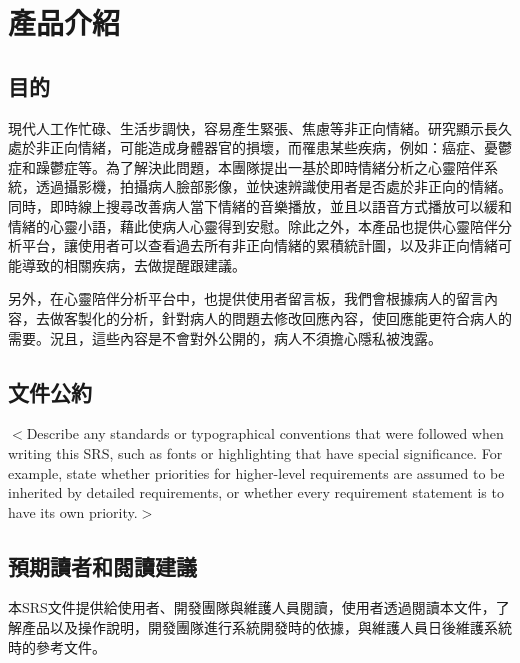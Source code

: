 \documentclass[12pt]{scrreprt}
\begin{document}
\chapter{產品介紹}

\section{目的}

現代人工作忙碌、生活步調快，容易產生緊張、焦慮等非正向情緒。研究顯示長久處於非正向情緒，可能造成身體器官的損壞，而罹患某些疾病，例如：癌症、憂鬱症和躁鬱症等。為了解決此問題，本團隊提出一基於即時情緒分析之心靈陪伴系統，透過攝影機，拍攝病人臉部影像，並快速辨識使用者是否處於非正向的情緒。同時，即時線上搜尋改善病人當下情緒的音樂播放，並且以語音方式播放可以緩和情緒的心靈小語，藉此使病人心靈得到安慰。除此之外，本產品也提供心靈陪伴分析平台，讓使用者可以查看過去所有非正向情緒的累積統計圖，以及非正向情緒可能導致的相關疾病，去做提醒跟建議。

另外，在心靈陪伴分析平台中，也提供使用者留言板，我們會根據病人的留言內容，去做客製化的分析，針對病人的問題去修改回應內容，使回應能更符合病人的需要。況且，這些內容是不會對外公開的，病人不須擔心隱私被洩露。

\section{文件公約} %
$<$Describe any standards or typographical conventions that were followed when 
writing this SRS, such as fonts or highlighting that have special significance.  
For example, state whether priorities  for higher-level requirements are assumed 
to be inherited by detailed requirements, or whether every requirement statement 
is to have its own priority.$>$

\section{預期讀者和閱讀建議}

本SRS文件提供給使用者、開發團隊與維護人員閱讀，使用者透過閱讀本文件，了解產品以及操作說明，開發團隊進行系統開發時的依據，與維護人員日後維護系統時的參考文件。 \\
\end{document}
